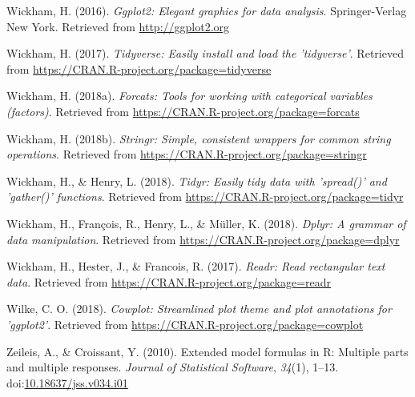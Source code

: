 \documentclass[man]{apa6}
\theoremstyle{definition}
\theoremstyle{definition}
\theoremstyle{definition}
\theoremstyle{remark}
\begin{document}
\hypertarget{ref-R-ggplot2}{}
Wickham, H. (2016). \emph{Ggplot2: Elegant graphics for data analysis}.
Springer-Verlag New York. Retrieved from \url{http://ggplot2.org}

\hypertarget{ref-R-tidyverse}{}
Wickham, H. (2017). \emph{Tidyverse: Easily install and load the
'tidyverse'}. Retrieved from
\url{https://CRAN.R-project.org/package=tidyverse}

\hypertarget{ref-R-forcats}{}
Wickham, H. (2018a). \emph{Forcats: Tools for working with categorical
variables (factors)}. Retrieved from
\url{https://CRAN.R-project.org/package=forcats}

\hypertarget{ref-R-stringr}{}
Wickham, H. (2018b). \emph{Stringr: Simple, consistent wrappers for
common string operations}. Retrieved from
\url{https://CRAN.R-project.org/package=stringr}

\hypertarget{ref-R-tidyr}{}
Wickham, H., \& Henry, L. (2018). \emph{Tidyr: Easily tidy data with
'spread()' and 'gather()' functions}. Retrieved from
\url{https://CRAN.R-project.org/package=tidyr}

\hypertarget{ref-R-dplyr}{}
Wickham, H., François, R., Henry, L., \& Müller, K. (2018). \emph{Dplyr:
A grammar of data manipulation}. Retrieved from
\url{https://CRAN.R-project.org/package=dplyr}

\hypertarget{ref-R-readr}{}
Wickham, H., Hester, J., \& Francois, R. (2017). \emph{Readr: Read
rectangular text data}. Retrieved from
\url{https://CRAN.R-project.org/package=readr}

\hypertarget{ref-R-cowplot}{}
Wilke, C. O. (2018). \emph{Cowplot: Streamlined plot theme and plot
annotations for 'ggplot2'}. Retrieved from
\url{https://CRAN.R-project.org/package=cowplot}

\hypertarget{ref-R-Formula}{}
Zeileis, A., \& Croissant, Y. (2010). Extended model formulas in R:
Multiple parts and multiple responses. \emph{Journal of Statistical
Software}, \emph{34}(1), 1--13.
doi:\href{https://doi.org/10.18637/jss.v034.i01}{10.18637/jss.v034.i01}

\endgroup
\end{document}
